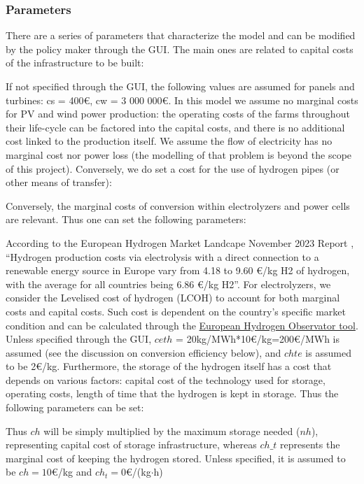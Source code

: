 \subsubsection{Parameters}
\color{gray}
There are a series of parameters that characterize the model and can be modified by the policy maker through the GUI. The main ones are related to capital costs of the infrastructure to be built:

If not specified through the GUI, the following values are assumed for panels and turbines: cs = 400\euro, cw = 3 000 000\euro. In this model we assume no marginal costs for PV and wind power production: the operating costs of the farms throughout their life-cycle can be factored into the capital costs, and there is no additional cost linked to the production itself. 
We assume the flow of electricity has no marginal cost nor power loss (the modelling of that problem is beyond the scope of this project). Conversely, we do set a cost for the use of hydrogen pipes (or other means of transfer):

Conversely, the marginal costs of conversion within electrolyzers and power cells are relevant. Thus one can set the following parameters:

According to the European Hydrogen Market Landcape November 2023 Report  \cite{European_H2_Market_landscape},
 ``Hydrogen production costs via electrolysis with a direct connection to a 
 renewable energy source in Europe vary from 4.18 to 9.60 €/kg H2 of hydrogen, with the average
  for all countries being 6.86 €/kg H2''. For electrolyzers, we consider the Levelised cost of hydrogen (LCOH)
   to account for both marginal costs and capital costs. Such cost is dependent on the country's specific market
    condition and can be calculated through the \href{https://observatory.clean-hydrogen.europa.eu/tools-reports/levelised-cost-hydrogen-calculator}{European Hydrogen Observator tool}. Unless specified through the GUI, $ceth$ = 20kg/MWh*10\euro/kg=200\euro/MWh is assumed (see the discussion on conversion efficiency below), and $chte$ is assumed to be 2\euro/kg. 
Furthermore, the storage of the hydrogen itself has a cost that depends on various factors: capital cost of the technology used for storage, operating costs, length of time that the hydrogen is kept in storage. Thus the following parameters can be set:

Thus $ch$ will be simply multiplied by the maximum storage needed ($nh$), representing capital
 cost of storage infrastructure, whereas $ch\_t$ represents the marginal cost of keeping the
  hydrogen stored.  Unless specified, it is assumed to be $ch=10$\euro/kg and $ch_t=0$\euro/(kg$\cdot$h)

